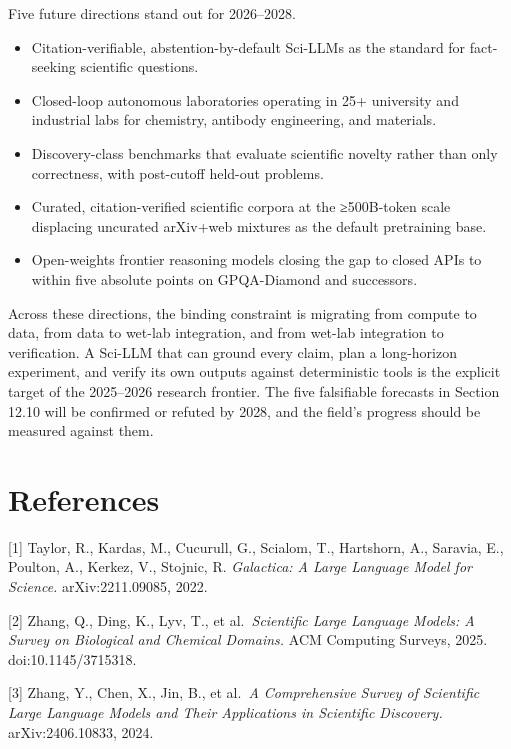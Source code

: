 Five future directions stand out for 2026--2028.

\begin{itemize}
\tightlist
\item
  Citation-verifiable, abstention-by-default Sci-LLMs as the standard for fact-seeking scientific questions.
\item
  Closed-loop autonomous laboratories operating in 25+ university and industrial labs for chemistry, antibody engineering, and materials.
\item
  Discovery-class benchmarks that evaluate scientific novelty rather than only correctness, with post-cutoff held-out problems.
\item
  Curated, citation-verified scientific corpora at the ≥500B-token scale displacing uncurated arXiv+web mixtures as the default pretraining base.
\item
  Open-weights frontier reasoning models closing the gap to closed APIs to within five absolute points on GPQA-Diamond and successors.
\end{itemize}

Across these directions, the binding constraint is migrating from compute to data, from data to wet-lab integration, and from wet-lab integration to verification. A Sci-LLM that can ground every claim, plan a long-horizon experiment, and verify its own outputs against deterministic tools is the explicit target of the 2025--2026 research frontier. The five falsifiable forecasts in Section 12.10 will be confirmed or refuted by 2028, and the field's progress should be measured against them.

\section{References}\label{references}

{[}1{]} Taylor, R., Kardas, M., Cucurull, G., Scialom, T., Hartshorn, A., Saravia, E., Poulton, A., Kerkez, V., Stojnic, R. \emph{Galactica: A Large Language Model for Science.} arXiv:2211.09085, 2022.

{[}2{]} Zhang, Q., Ding, K., Lyv, T., et al.~\emph{Scientific Large Language Models: A Survey on Biological and Chemical Domains.} ACM Computing Surveys, 2025. doi:10.1145/3715318.

{[}3{]} Zhang, Y., Chen, X., Jin, B., et al.~\emph{A Comprehensive Survey of Scientific Large Language Models and Their Applications in Scientific Discovery.} arXiv:2406.10833, 2024.

